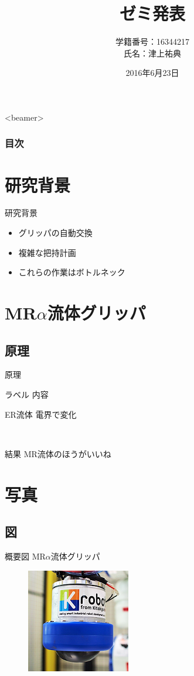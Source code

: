 \documentclass[dvipdfmx]{beamer}
\title{\bfseries ゼミ発表}
\author{学籍番号：16344217 \\氏名：津上祐典}
\institute[]{九州工業大学大学院　工学府\\機械知能工学専攻　知能制御工学コー
ス　西田研究室}
\date{2016年6月23日}
\begin{document}
\begin{frame}
 \titlepage 
\end{frame}

\begin{frame}<beamer> 
  \frametitle{目次}
  \tableofcontents
\end{frame}

\section{研究背景} %
\begin{frame}{研究背景} %
 \begin{itemize}
  \item グリッパの自動交換
  \item 複雑な把持計画
  \item これらの作業は\alert{ボトルネック}
 \end{itemize}
\end{frame} 

\section{MR$\alpha$流体グリッパ}

\subsection{原理}



\begin{frame}{原理}
\begin{block}{ラベル} 
内容
\end{block}
\begin{block}{ER流体}
電界で変化
\end{block}

\pause　%
\begin{alertblock}{結果}
MR流体のほうがいいね
\end{alertblock}
\end{frame}



\section{写真}

\subsection{図}

\begin{frame}{概要図}
MR$\alpha$流体グリッパ
\begin{figure}
\includegraphics[scale=1,bb = 0 0 171 171]{fig/s_gripperp.png}
\end{figure}
\end{frame}
\end{document}
